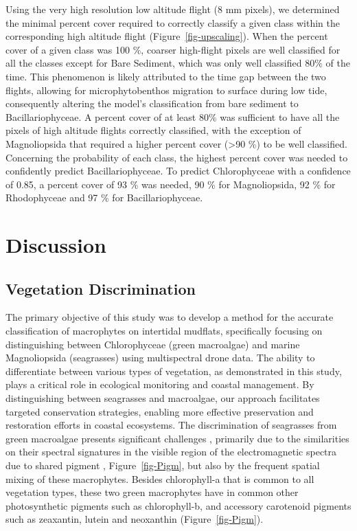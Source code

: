 \documentclass[
  number]{elsarticle}
\begin{document}
Using the very high resolution low altitude flight (8 mm pixels), we
determined the minimal percent cover required to correctly classify a
given class within the corresponding high altitude flight
(Figure~\ref{fig-upscaling}). When the percent cover of a given class
was 100 \%, coarser high-flight pixels are well classified for all the
classes except for Bare Sediment, which was only well classified 80\% of
the time. This phenomenon is likely attributed to the time gap between
the two flights, allowing for microphytobenthos migration to surface
during low tide, consequently altering the model's classification from
bare sediment to Bacillariophyceae. A percent cover of at least 80\% was
sufficient to have all the pixels of high altitude flights correctly
classified, with the exception of Magnoliopsida that required a higher
percent cover (\textgreater90 \%) to be well classified. Concerning the
probability of each class, the highest percent cover was needed to
confidently predict Bacillariophyceae. To predict Chlorophyceae with a
confidence of 0.85, a percent cover of 93 \% was needed, 90 \% for
Magnoliopsida, 92 \% for Rhodophyceae and 97 \% for Bacillariophyceae.

\section{Discussion}\label{discussion}

\subsection{Vegetation Discrimination}\label{vegetation-discrimination}

The primary objective of this study was to develop a method for the
accurate classification of macrophytes on intertidal mudflats,
specifically focusing on distinguishing between Chlorophyceae (green
macroalgae) and marine Magnoliopsida (seagrasses) using multispectral
drone data. The ability to differentiate between various types of
vegetation, as demonstrated in this study, plays a critical role in
ecological monitoring and coastal management. By distinguishing between
seagrasses and macroalgae, our approach facilitates targeted
conservation strategies, enabling more effective preservation and
restoration efforts in coastal ecosystems. The discrimination of
seagrasses from green macroalgae presents significant challenges
\citetext{\citealp[ ]{oiry2021using}; \citealp[
]{bannari2022}; \citealp{veettil2020opportunities}}, primarily due to
the similarities on their spectral signatures in the visible region of
the electromagnetic spectra due to shared pigment
, Figure~\ref{fig-Pigm}, but also by the frequent spatial mixing of
these macrophytes. Besides chlorophyll-a that is common to all
vegetation types, these two green macrophytes have in common other
photosynthetic pigments such as chlorophyll-b, and accessory carotenoid
pigments such as zeaxantin, lutein and neoxanthin
(Figure~\ref{fig-Pigm}).
\end{document}
